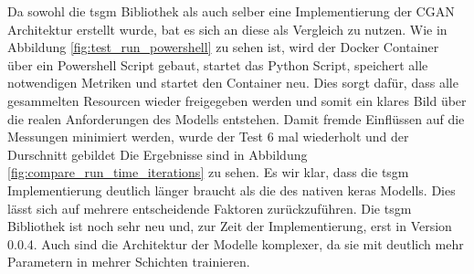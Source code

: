 Da sowohl die tsgm Bibliothek als auch selber eine Implementierung der \ac{CGAN} Architektur erstellt wurde, bat es sich an diese als Vergleich zu nutzen. Wie in Abbildung \ref{fig:test_run_powershell} zu sehen ist, wird der Docker Container über ein Powershell Script gebaut, startet das Python Script, speichert alle notwendigen Metriken und startet den Container neu.
Dies sorgt dafür, dass alle gesammelten Resourcen wieder freigegeben werden und somit ein klares Bild über die realen Anforderungen des Modells entstehen. Damit fremde Einflüssen auf die Messungen minimiert werden, wurde der Test 6 mal wiederholt und der Durschnitt gebildet
Die Ergebnisse sind in Abbildung \ref{fig:compare_run_time_iterations} zu sehen.
Es wir klar, dass die tsgm Implementierung deutlich länger braucht als die des nativen keras Modells.
Dies lässt sich auf mehrere entscheidende Faktoren zurückzuführen. Die tsgm Bibliothek ist noch sehr neu und, zur Zeit der Implementierung, erst in Version 0.0.4. Auch sind die Architektur der Modelle komplexer, da sie mit deutlich mehr Parametern in mehrer Schichten trainieren.


